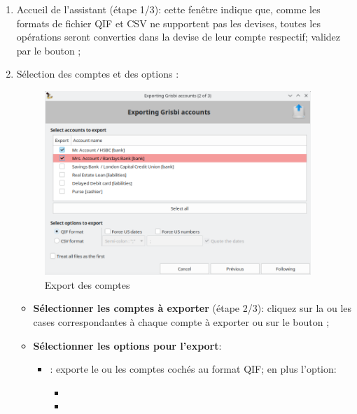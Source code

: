 \begin{enumerate}
	\item Accueil de l'assistant (étape 1/3): cette fenêtre indique que, comme les formats de fichier \gls{QIF} et \gls{CSV} ne supportent pas les devises, toutes les opérations seront converties dans la devise de leur compte respectif; validez par le bouton ;
	\item Sélection des comptes et des options :
		\begin{figure}[htbp]
			\begin{center}
				\includegraphics[width=0.95\textwidth]{image/screenshot/importexport_export}
			\end{center}
			\caption{Export des comptes}
			\label{importexport-export-img}
		\end{figure}
		\begin{itemize}
			\item \textbf{Sélectionner les comptes à exporter} (étape 2/3): cliquez sur la ou les cases correspondantes à chaque compte à exporter ou sur le bouton ;
			\item \textbf{Sélectionner les options pour l'export}:
			\begin{itemize}
					\item {}: exporte le ou les comptes cochés au format \gls{QIF}; en plus l'option:
						\begin{itemize}
							\item
							\item

\end{itemize}
\end{itemize}
\end{itemize}
\end{enumerate}
